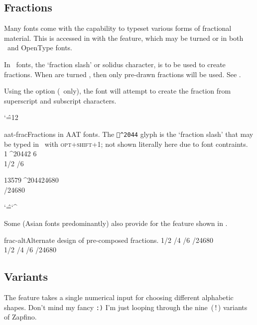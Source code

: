 \subsection{Fractions}
Many fonts come with the capability to typeset various forms of
fractional material. This is accessed in  with the
 feature, which may be turned  or 
in both \AAT\ and OpenType fonts.

In \AAT\ fonts, the `fraction slash' or solidus character, is
to be used to create fractions. When  are turned
, then only pre-drawn fractions will be used.
See .

Using the  option (\AAT\ only), the font will attempt
to create the fraction from superscript and subscript
characters.

\edef\caretcc{\the\catcode`\^}
\catcode`\^=12\relax
\begin{Xexample}{aat-frac}{Fractions in AAT fonts. The \texttt{\relax^^^^2044} glyph is the `fraction slash' that may be typed in \MacOSX\ with \textsc{opt+shift+1}; not shown literally here due to font contraints.}
   1{^^^^2044}2 6 \\ %
   1/2 /6    %

         13579{^^^^2044}24680 \\ %
   /24680    %
\end{Xexample}
\catcode`\^=\caretcc\relax

Some (Asian fonts predominantly) also provide for the
 feature shown in .

\begin{Xexample}{frac-alt}{Alternate design of pre-composed fractions.}
   1/2 /4 /6 /24680 \\
   1/2 /4 /6 /24680
\end{Xexample}


\subsection{Variants}
The  feature takes a single numerical input for
choosing different alphabetic shapes. Don't mind my fancy 
\texttt{:)} I'm just looping through the nine~(\,!\,) variants of
Zapfino.

